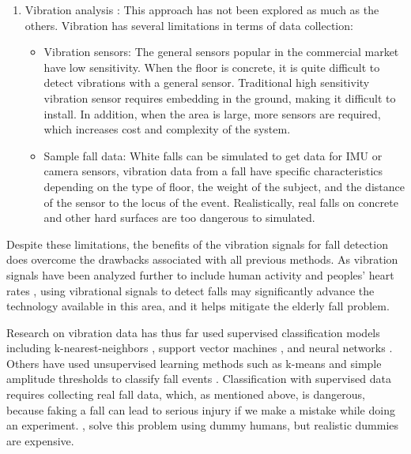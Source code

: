 \begin{enumerate}
    \item Vibration analysis
          \cite{alwan_rajendran_kell_mack_dalal_wolfe_felder_2006,liu_jiang_su_benzoni_maxwell_2019,clemente_li_valero_song_2020}: This approach has not been explored as much as the others. Vibration has several limitations in terms of data collection:
          \begin{itemize}

              \item Vibration sensors: The general sensors popular in the commercial market have low sensitivity. When the floor is concrete, it is quite difficult to detect vibrations with a general sensor. Traditional high sensitivity vibration sensor requires embedding in the ground, making it difficult to install. In addition, when the area is large, more sensors are required, which increases cost and complexity of the system.

              \item Sample fall data: White falls can be simulated to get data for IMU or camera sensors, vibration data from a fall have specific characteristics depending on the type of floor, the weight of the subject, and the distance of the sensor to the locus of the event. Realistically, real falls on concrete and other hard surfaces are too dangerous to simulated.
          \end{itemize}
\end{enumerate}


Despite these limitations, the benefits of the vibration signals for fall detection does overcome the drawbacks associated with all previous methods. As vibration signals have been analyzed further to include human activity and peoples’ heart rates \cite{jia_howard_zhang_zhang_2017}, using vibrational signals to detect falls may significantly advance the technology available in this area, and it helps mitigate the elderly fall problem.


Research on vibration data has thus far used supervised classification models including k-nearest-neighbors \cite{shao_wang_song_ilyas_guo_chang_2020}, support vector machines \cite{wang_chen_zhou_sun_dong_2015, kasturi_jo_2017,liu_jiang_su_benzoni_maxwell_2019}, and neural networks \cite{sultana_deb_dhar_koshiba_2021}. Others have used unsupervised learning methods such as k-means \cite{shao_wang_song_ilyas_guo_chang_2020} and simple amplitude thresholds to classify fall events \cite{alwan_rajendran_kell_mack_dalal_wolfe_felder_2006,charlon_bourennane_bettahar_campo_2013,britto_filho_lubaszewski_2020}. Classification with supervised data requires collecting real fall data, which, as mentioned above, is dangerous, because faking a fall can lead to serious injury if we make a mistake while doing an experiment. \citeauthor{liu_jiang_su_benzoni_maxwell_2019}, \citeyear{liu_jiang_su_benzoni_maxwell_2019} solve this problem using dummy humans, but realistic dummies are expensive.


